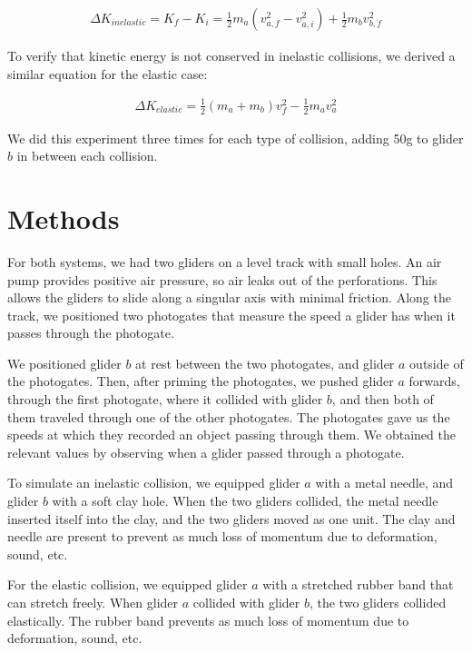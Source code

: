 \documentclass[12pt]{article}
\begin{document}
\begin{align}\label{eq:delta_ke}
\Delta K_{inelastic} = K_f - K_i = \frac{1}{2} m_a \left( v_{a,f}^2 - v_{a,i}^2 \right) + \frac{1}{2} m_b v_{b,f}^2
\end{align}

To verify that kinetic energy is not conserved in inelastic collisions, we derived a similar equation for the elastic case:

\begin{align}\label{eq:delta_ke_elastic}
\Delta K_{elastic} = \frac{1}{2} (m_a + m_b) v_f^2 - \frac{1}{2} m_a v_a^2
\end{align}

We did this experiment three times for each type of collision, adding 50g to glider \(b\) in between each collision.
\section{Methods}
\label{sec:org31a209c}

For both systems, we had two gliders on a level track with small holes. An air pump provides positive air pressure, so air leaks out of the perforations. This allows the gliders to slide along a singular axis with minimal friction. Along the track, we positioned two photogates that measure the speed a glider has when it passes through the photogate.

We positioned glider \(b\) at rest between the two photogates, and glider \(a\) outside of the photogates. Then, after priming the photogates, we pushed glider \(a\) forwards, through the first photogate, where it collided with glider \(b\), and then both of them traveled through one of the other photogates. The photogates gave us the speeds at which they recorded an object passing through them. We obtained the relevant values by observing when a glider passed through a photogate.

To simulate an inelastic collision, we equipped glider \(a\) with a metal needle, and glider \(b\) with a soft clay hole. When the two gliders collided, the metal needle inserted itself into the clay, and the two gliders moved as one unit. The clay and needle are present to prevent as much loss of momentum due to deformation, sound, etc.

For the elastic collision, we equipped glider \(a\) with a stretched rubber band that can stretch freely. When glider \(a\) collided with glider \(b\), the two gliders collided elastically. The rubber band prevents as much loss of momentum due to deformation, sound, etc.
\end{document}
